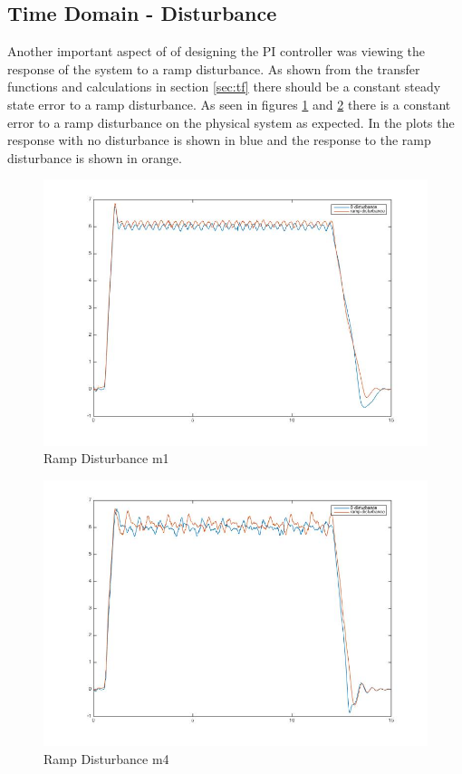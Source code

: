 \documentclass[11pt,titlepage]{article}
\begin{document}
    \subsection{Time Domain - Disturbance} \label{sub:dist}
    Another important aspect of of designing the PI controller was viewing the response of the system to a ramp disturbance. As shown from the transfer functions and calculations in section \ref{sec:tf} there should be a constant steady state error to a ramp disturbance. As seen in figures \ref{fig:distm1} and \ref{fig:distm4} there is a constant error to a ramp disturbance on the physical system as expected. In the plots the response with no disturbance is shown in blue and the response to the ramp disturbance is shown in orange.
    \begin{figure}[H]
        \centering
        \includegraphics[scale=.5]{m1dist}
        \caption{Ramp Disturbance m1}
        \label{fig:distm1}
    \end{figure} 
    \begin{figure}[H]
        \centering
        \includegraphics[scale=.5]{m4dist}
        \caption{Ramp Disturbance m4}
        \label{fig:distm4}
    \end{figure} 
\end{document}
